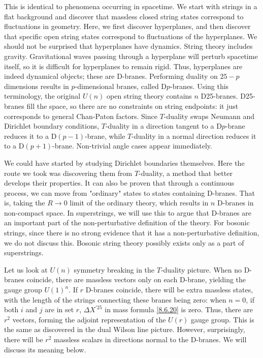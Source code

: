 This is identical to phenomena occurring in spacetime. We start with strings in a flat background and discover that massless closed string states correspond to fluctuations in geometry. 
Here, we first discover hyperplanes, and then discover that specific open string states correspond to fluctuations of the hyperplanes. We should not be surprised that hyperplanes have dynamics. 
String theory includes gravity. Gravitational waves passing through a hyperplane will perturb spacetime itself, so it is difficult for hyperplanes to remain rigid. 
Thus, hyperplanes are indeed dynamical objects; these are D-branes. Performing duality on $25-p$ dimensions results in $p$-dimensional branes, called D$p$-branes. 
Using this terminology, the original $U(n)$ open string theory contains $n$ D25-branes. D25-branes fill the space, so there are no constraints on string endpoints: it just corresponds to general Chan-Paton factors. 
Since $T$-duality swaps Neumann and Dirichlet boundary conditions, $T$-duality in a direction tangent to a D$p$-brane reduces it to a D$(p{-}1)$-brane, 
while $T$-duality in a normal direction reduces it to a D$(p{+}1)$-brane. Non-trivial angle cases appear immediately. 

We could have started by studying Dirichlet boundaries themselves. Here the route we took was discovering them from $T$-duality, a method that better develops their properties. 
It can also be proven that through a continuous process, we can move from "ordinary" states to states containing D-branes. That is, taking the $R \rightarrow 0$ limit of the ordinary theory, which results in $n$ D-branes in non-compact space. 
In superstrings, we will use this to argue that D-branes are an important part of the non-perturbative definition of the theory. For bosonic strings, since there is no strong evidence that it has a non-perturbative definition, we do not discuss this. 
Bosonic string theory possibly exists only as a part of superstrings.

Let us look at $U(n)$ symmetry breaking in the $T$-duality picture. When no D-branes coincide, there are massless vectors only on each D-brane, yielding the gauge group $U(1)^{n}$. 
If $r$ D-branes coincide, there will be extra massless states, with the length of the strings connecting these branes being zero: when $n=0$, if both $i$ and $j$ are in set $r$, 
$\Delta X^{\prime 25}$ in mass formula \eqref{8.6.20} is zero. Thus, there are $r^{2}$ vectors, forming the adjoint representation of the $U(r)$ gauge group. 
This is the same as discovered in the dual Wilson line picture. However, surprisingly, there will be $r^{2}$ massless scalars in directions normal to the D-branes. We will discuss its meaning below.

